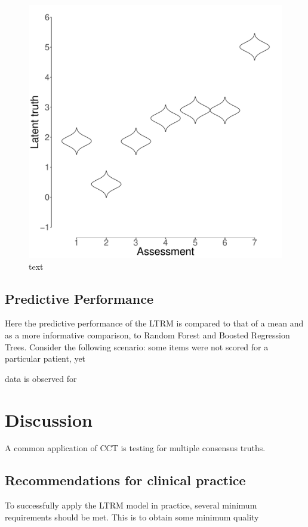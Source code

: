 \documentclass{article}
\begin{document}
\begin{figure}[!ht]
	\includegraphics[width=\linewidth]{figures/progressMonitoring.pdf}
	\caption{text}
	\label{fig:parameterRecovery}
\end{figure}

\subsection*{Predictive Performance}
Here the predictive performance of the LTRM  is compared to that of a mean and as a more informative comparison, to Random Forest and Boosted Regression Trees. Consider the following scenario: some items were not scored for a particular patient, yet 

data is observed for 




\section*{Discussion}


A common application of CCT is testing for multiple consensus truths.

\subsection*{Recommendations for clinical practice}
To successfully apply the LTRM model in practice, several minimum requirements should be met. This is to obtain some minimum quality
\end{document}
